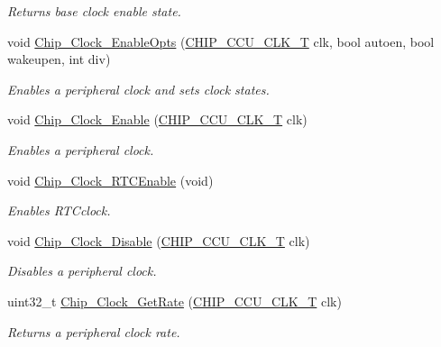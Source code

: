 \begin{DoxyCompactItemize}
\begin{DoxyCompactList}\small\item\em Returns base clock enable state. \end{DoxyCompactList}\item 
void \hyperlink{group___c_l_o_c_k__18_x_x__43_x_x_gadfa0a46d347a3174c7f67edbaf3a66f8}{Chip\+\_\+\+Clock\+\_\+\+Enable\+Opts} (\hyperlink{chip__clocks_8h_a45bb23228b9831321626c103ada7c60b}{C\+H\+I\+P\+\_\+\+C\+C\+U\+\_\+\+C\+L\+K\+\_\+T} clk, bool autoen, bool wakeupen, int div)
\begin{DoxyCompactList}\small\item\em Enables a peripheral clock and sets clock states. \end{DoxyCompactList}\item 
void \hyperlink{group___c_l_o_c_k__18_x_x__43_x_x_ga002dee3b9dfa6bde2445e6fff165f0f1}{Chip\+\_\+\+Clock\+\_\+\+Enable} (\hyperlink{chip__clocks_8h_a45bb23228b9831321626c103ada7c60b}{C\+H\+I\+P\+\_\+\+C\+C\+U\+\_\+\+C\+L\+K\+\_\+T} clk)
\begin{DoxyCompactList}\small\item\em Enables a peripheral clock. \end{DoxyCompactList}\item 
void \hyperlink{group___c_l_o_c_k__18_x_x__43_x_x_gad43f808e0218e20dfc000fc0248da1a4}{Chip\+\_\+\+Clock\+\_\+\+R\+T\+C\+Enable} (void)
\begin{DoxyCompactList}\small\item\em Enables R\+T\+Cclock. \end{DoxyCompactList}\item 
void \hyperlink{group___c_l_o_c_k__18_x_x__43_x_x_ga847e7bcd709e030752213380e78039ec}{Chip\+\_\+\+Clock\+\_\+\+Disable} (\hyperlink{chip__clocks_8h_a45bb23228b9831321626c103ada7c60b}{C\+H\+I\+P\+\_\+\+C\+C\+U\+\_\+\+C\+L\+K\+\_\+T} clk)
\begin{DoxyCompactList}\small\item\em Disables a peripheral clock. \end{DoxyCompactList}\item 
uint32\+\_\+t \hyperlink{group___c_l_o_c_k__18_x_x__43_x_x_gafb964074c3fa133e29c51bd31e4590ae}{Chip\+\_\+\+Clock\+\_\+\+Get\+Rate} (\hyperlink{chip__clocks_8h_a45bb23228b9831321626c103ada7c60b}{C\+H\+I\+P\+\_\+\+C\+C\+U\+\_\+\+C\+L\+K\+\_\+T} clk)
\begin{DoxyCompactList}\small\item\em Returns a peripheral clock rate. \end{DoxyCompactList}\item 

\end{DoxyCompactItemize}

